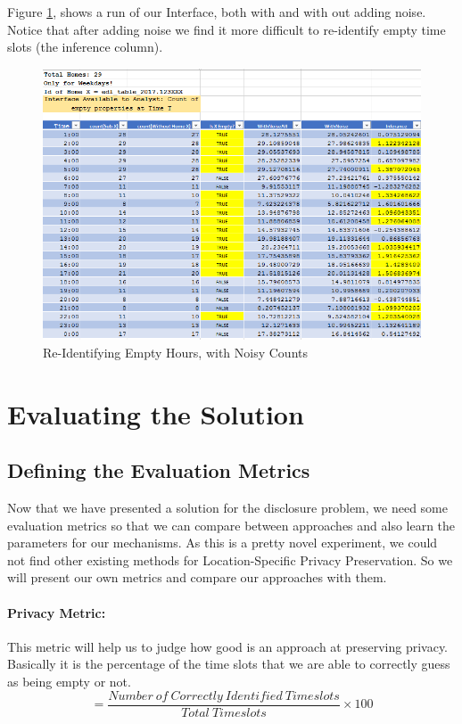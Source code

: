 \documentclass[12pt]{report}
\theoremstyle{named}
\begin{document}
Figure \ref{fig:NoisyCountReID}, shows a run of our Interface, both with and with out adding noise. Notice that after adding noise we find it more difficult to re-identify empty time slots (the inference column).

\begin{figure}[ht]
\centering
        \includegraphics[width=150mm,scale=1]{Images/NoisyCountReID.PNG}
    \caption{Re-Identifying Empty Hours, with Noisy Counts}
    \label{fig:NoisyCountReID}
\end{figure}


\section{Evaluating the Solution}
\subsection{Defining the Evaluation Metrics}
Now that we have presented a solution for the disclosure problem, we need some evaluation metrics so that we can compare between approaches and also learn the parameters for our mechanisms. As this is a pretty novel experiment, we could not find other existing methods for Location-Specific Privacy Preservation. So we will present our own metrics and compare our approaches with them.

\paragraph{\textbf{Privacy Metric:}} This metric will help us to judge how good is an approach at preserving privacy. Basically it is the percentage of the time slots that we are able to correctly guess as being empty or not.
\[=\frac{Number\ of\ Correctly\ Identified\ Timeslots}{Total\ Timeslots} \times 100\]
\end{document}
